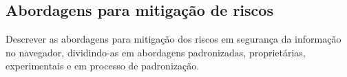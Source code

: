 \subsection{Abordagens para mitigação de riscos}
\begin{todo}
	Descrever as abordagens para mitigação dos riscos  em segurança da informação no navegador, dividindo-as em abordagens padronizadas, proprietárias, experimentais e em processo de padronização.
\end{todo}
\tbc